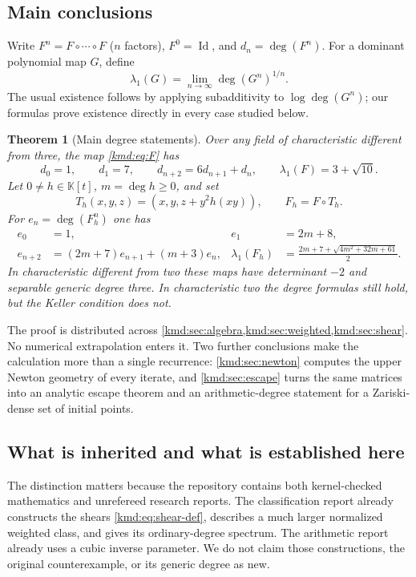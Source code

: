 \documentclass[11pt,a4paper]{article}
\numberwithin{equation}{section}
\newtheorem{theorem}{Theorem}[section]
\theoremstyle{definition}
\theoremstyle{remark}
\newcommand{\K}{\mathbb K}
\newcommand{\dd}{\operatorname{deg}}
\newcommand{\Id}{\operatorname{Id}}
\begin{document}
\subsection{Main conclusions}
Write $F^n=F\circ\cdots\circ F$ ($n$ factors), $F^0=\Id$, and
$d_n=\dd(F^n)$. For a dominant polynomial map $G$, define
\begin{equation}
 \lambda_1(G)=\lim_{n\to\infty}\dd(G^n)^{1/n}.
 \label{kmd:eq:lambda-def}
\end{equation}
The usual existence follows by applying subadditivity to
$\log\dd(G^n)$; our formulas prove existence directly in every case
studied below.

\begin{theorem}[Main degree statements]\label{kmd:thm:main}
Over any field of characteristic different from three, the map
\eqref{kmd:eq:F} has
\begin{equation}
 d_0=1,\qquad d_1=7,\qquad d_{n+2}=6d_{n+1}+d_n,
 \qquad \lambda_1(F)=3+\sqrt{10}.
 \label{kmd:eq:main-base}
\end{equation}
Let $0\ne h\in\K[t]$, $m=\dd h\ge0$, and set
\begin{equation}
 T_h(x,y,z)=(x,y,z+y^2h(xy)),\qquad F_h=F\circ T_h.
 \label{kmd:eq:shear-def}
\end{equation}
For $e_n=\dd(F_h^n)$ one has
\begin{align}
 e_0&=1,&e_1&=2m+8,\nonumber\\
 e_{n+2}&=(2m+7)e_{n+1}+(m+3)e_n,&
 \lambda_1(F_h)&=\frac{2m+7+\sqrt{4m^2+32m+61}}2.
 \label{kmd:eq:main-shear}
\end{align}
In characteristic different from two these maps have determinant $-2$
and separable generic degree three. In characteristic two the degree
formulas still hold, but the Keller condition does not.
\end{theorem}

The proof is distributed across \cref{kmd:sec:algebra,kmd:sec:weighted,kmd:sec:shear}.
No numerical extrapolation enters it. Two further conclusions make the
calculation more than a single recurrence: \cref{kmd:sec:newton} computes the
upper Newton geometry of every iterate, and \cref{kmd:sec:escape} turns the
same matrices into an analytic escape theorem and an arithmetic-degree
statement for a Zariski-dense set of initial points.

\subsection{What is inherited and what is established here}
The distinction matters because the repository contains both
kernel-checked mathematics and unrefereed research reports. The
classification report \cite{weighted} already constructs the shears
\eqref{kmd:eq:shear-def}, describes a much larger normalized weighted
class, and gives its ordinary-degree spectrum. The arithmetic report
\cite{arithmetic} already uses a cubic inverse parameter. We do not
claim those constructions, the original counterexample, or its
generic degree as new.
\end{document}
